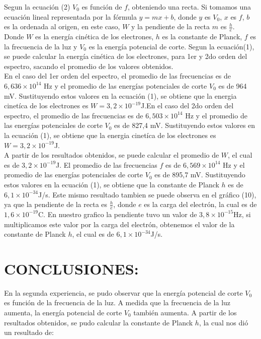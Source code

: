 \documentclass[a4paper]{article}
\begin{document}
      \indent Segun la ecuación (2) $V_{0}$ es función de $f$, obteniendo una recta. Si tomamos una ecuación lineal representada por la fórmula $y = mx + b$, donde $y$ es $V_{0}$, $x$ es $f$, $b$ es la ordenada al origen, en este caso, $W$ y  la pendiente de la recta $m$ es $\frac{h}{e}$.\\
      \indent Donde $W$ es la energía cinética de los electrones, $h$ es la constante de Planck, $f$ es la frecuencia de la luz y $V_{0}$ es la energía potencial de corte. Segun la ecuación(1), se puede calcular la energía cinética de los electrones, para 1er y 2do orden del espectro, sacando el promedio de los valores obtenidos.\\
      \indent En el caso del 1er orden del espectro, el promedio de las frecuencias es de $6,636 \times 10^{14}$ Hz y el promedio de las energías potenciales de corte $V_{0}$ es de 964 mV. Sustituyendo estos valores en la ecuación (1), se obtiene que la energia cinetíca de los electrones es $W = 3,2 \times 10^{-19}$J.En el caso del 2do orden del espectro, el promedio de las frecuencias es de $6,503 \times 10^{14}$ Hz y el promedio de las energías potenciales de corte $V_{0}$ es de 827,4 mV. Sustituyendo estos valores en la ecuación (1), se obtiene que la energia cinetíca de los electrones es $W = 3,2 \times 10^{-19}$J.\\
      \indent A partir de los resultados obtenidos, se puede calcular el promedio de $W$, el cual es de $3,2 \times 10^{-19}$J. El promedio de las frecuencias $f$ es de $6,569 \times 10^{14}$ Hz y el promedio de las energías potenciales de corte $V_{0}$ es de 895,7 mV. Sustituyendo estos valores en la ecuación (1), se obtiene que la constante de Planck $h$ es de $6,1 \times 10^{-34}$J/s. Este mismo resultado tambien se puede observa en el gráfico (10), ya que la pendiente de la recta es $\frac{h}{e}$, donde $e$ es la carga del electrón, la cual es de $1,6 \times 10^{-19}$C. En nuestro grafico la pendiente tuvo un valor de $3,8 \times 10^{-15}$Hz, si multiplicamos este valor por la carga del electrón, obtenemos el valor de la constante de Planck $h$, el cual es de $6,1 \times 10^{-34}$J/s.\\
      \vspace{5mm}
      
    \section{CONCLUSIONES:}
    \indent En la segunda experiencia, se pudo observar que la energía potencial de corte $V_{0}$ es función de la frecuencia de la luz. A medida que la frecuencia de la luz aumenta, la energía potencial de corte $V_{0}$ también aumenta. A partir de los resultados obtenidos, se pudo calcular la constante de Planck $h$, la cual nos dió un resultado de:
    
\end{document}

